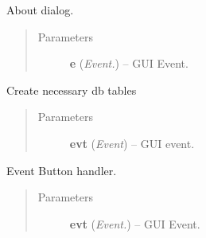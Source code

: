 \documentclass[letterpaper,10pt,english]{sphinxmanual}
\begin{document}
\begin{fulllineitems}
\begin{fulllineitems}
\begin{quote}
\begin{description}
\end{description}\end{quote}

\end{fulllineitems}


\begin{fulllineitems}
\label{api:wos.GUI.OnAboutBox}
About dialog.
\begin{quote}\begin{description}
\item[{Parameters}] \leavevmode
\textbf{e} (\emph{Event.}) -- GUI Event.

\end{description}\end{quote}

\end{fulllineitems}


\begin{fulllineitems}
\label{api:wos.GUI.OnCreateTables}
Create necessary db tables
\begin{quote}\begin{description}
\item[{Parameters}] \leavevmode
\textbf{evt} (\emph{Event}) -- GUI event.

\end{description}\end{quote}

\end{fulllineitems}


\begin{fulllineitems}
\label{api:wos.GUI.OnEvtBtn}
Event Button handler.
\begin{quote}\begin{description}
\item[{Parameters}] \leavevmode
\textbf{evt} (\emph{Event.}) -- GUI Event.

\end{description}\end{quote}

\end{fulllineitems}


\end{fulllineitems}
\end{document}
